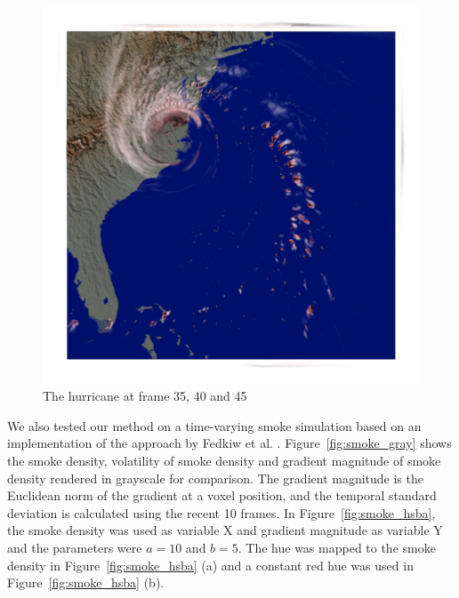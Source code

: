 \begin{figure}
\begin{minipage}{.33\textwidth}
	\subcaption{}
\end{minipage}~
\begin{minipage}{.33\textwidth}
	\includegraphics[width=1\linewidth]{figures/hurricane_hsba_0_10stdprecip_1-4cloud_precip_45}
	\subcaption{}
\end{minipage}
\caption{The hurricane at frame 35, 40 and 45}
\label{fig:hurricane_precip}
\end{figure}

We also tested our method on a time-varying smoke simulation based on an implementation of the approach by Fedkiw et al. \cite{fedkiw_visual_2001}. Figure~\ref{fig:smoke_gray} shows the smoke density, volatility of smoke density and gradient magnitude of smoke density rendered in grayscale for comparison.
The gradient magnitude is the Euclidean norm of the gradient at a voxel position,
and the temporal standard deviation is calculated using the recent 10 frames.
In Figure~\ref{fig:smoke_hsba}, the smoke density was used as variable X and gradient magnitude as variable Y and the parameters were $a=10$ and $b=5$.
The hue was mapped to the smoke density in Figure~\ref{fig:smoke_hsba} (a) and a constant red hue was used in Figure~\ref{fig:smoke_hsba} (b).

